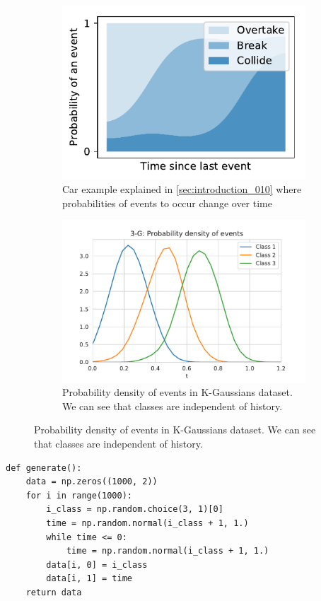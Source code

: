\begin{figure}[H]
\centering
    \begin{subfigure}{.45\textwidth}
        \centering
    	\includegraphics[width=.8\linewidth]{sections/010_neurips2019/paper/images/categorical_evolution.pdf}
        \caption{Car example explained in \cref{sec:introduction_010} where probabilities of events to occur change over time}
    \label{fig:car_categorical}
    \end{subfigure}%
    \hspace*{10.mm}
    \begin{subfigure}{.45\textwidth}
        \centering
   		\includegraphics[width=.8 \linewidth]{sections/010_neurips2019/paper/images/k-gaussians-density.pdf}
		\caption{Probability density of events in K-Gaussians dataset. We can see that classes are independent of history.}\label{fig:k-gaussians-density}
    \end{subfigure}
\end{figure}

\begin{minipage}{\linewidth}
\begin{verbatim}
def generate():
    data = np.zeros((1000, 2))
    for i in range(1000):
        i_class = np.random.choice(3, 1)[0]
        time = np.random.normal(i_class + 1, 1.)
        while time <= 0:
            time = np.random.normal(i_class + 1, 1.)
        data[i, 0] = i_class
        data[i, 1] = time
    return data
\end{verbatim}
\end{minipage}

